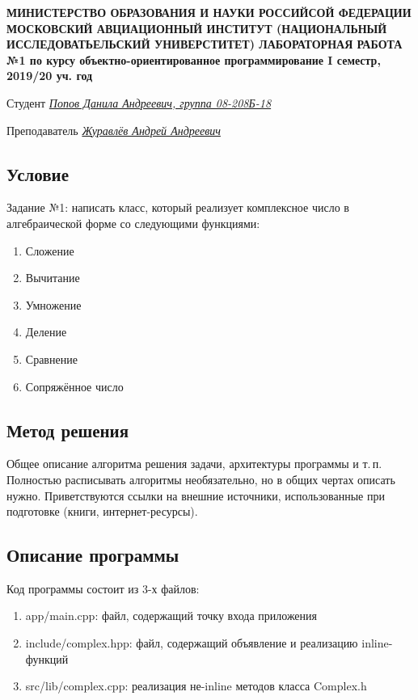 \documentclass[12pt]{article}
\begin{document}
\begin{titlepage}
\begin{center}
\textbf{МИНИСТЕРСТВО ОБРАЗОВАНИЯ И НАУКИ РОССИЙСОЙ ФЕДЕРАЦИИ
\medskip
МОСКОВСКИЙ АВЦИАЦИОННЫЙ ИНСТИТУТ
(НАЦИОНАЛЬНЫЙ ИССЛЕДОВАТЬЕЛЬСКИЙ УНИВЕРСТИТЕТ)
\vfill\vfill
{\Huge ЛАБОРАТОРНАЯ РАБОТА №1} 
по курсу объектно-ориентированное программирование
I семестр, 2019/20 уч. год}
\end{center}
\vfill

Студент \uline{\it {Попов Данила Андреевич, группа 08-208Б-18}\hfill}

Преподаватель \uline{\it {Журавлёв Андрей Андреевич}\hfill}

\vfill
\end{titlepage}

\subsection*{Условие}

Задание №1: написать класс, который реализует комплексное число в алгебраической форме со следующими функциями: 
\begin{enumerate}
\item Сложение
\item Вычитание
\item Умножение 
\item Деление
\item Сравнение
\item Сопряжённое число
\end{enumerate}

\subsection*{Метод решения}


Общее описание алгоритма решения задачи, архитектуры программы и
т.\,п. Полностью расписывать алгоритмы необязательно, но в общих чертах
описать нужно. Приветствуются ссылки на внешние источники,
использованные при подготовке (книги, интернет-ресурсы). 

\subsection*{Описание программы}

Код программы состоит из 3-х файлов:
\begin{enumerate}
\item app/main.cpp: файл, содержащий точку входа приложения
\item include/complex.hpp: файл, содержащий объявление и реализацию inline-функций
\item src/lib/complex.cpp: реализация не-inline методов класса Complex.h
\end{enumerate}
\end{document}
